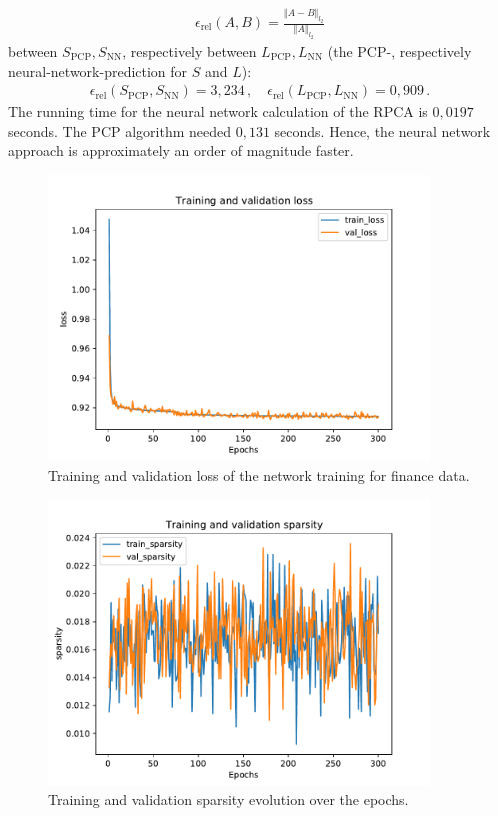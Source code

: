 \begin{align}
\epsilon_\text{rel}(A,B) = \frac{\Vert A - B \Vert_{l_2}}{\Vert A \Vert_{l_2}}
\end{align}
between $S_\text{PCP}, S_\text{NN}$, respectively between $L_\text{PCP}, L_\text{NN}$ (the PCP-, respectively neural-network-prediction for $S$ and $L$):
\begin{align}
\epsilon_\text{rel}(S_\text{PCP},S_\text{NN}) = 3,234\,, \quad  \epsilon_\text{rel}(L_\text{PCP},L_\text{NN}) = 0,909 \,.
\end{align}
The running time for the neural network calculation of the RPCA is $0,0197$ seconds. The PCP algorithm needed $0,131$ seconds. Hence, the neural network approach is approximately an order of magnitude faster.
\begin{figure}
	\centering
	\includegraphics[width=0.9\textwidth]{fig/loss_finance.pdf}
	\caption{Training and validation loss of the network training for finance data.}
	\label{fig:finance_training}
\end{figure}
\begin{figure}
	\centering
	\includegraphics[width=0.9\textwidth]{fig/sparsity_finance.pdf}
	\caption{Training and validation sparsity evolution over the epochs.}
	\label{fig:finance_sparsity}
\end{figure}
